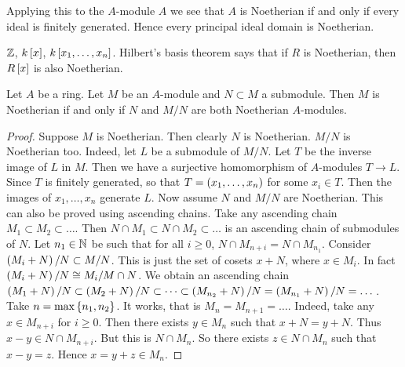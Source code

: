 \begin{remark}
Applying this to the $ A $-module $ A $ we see that $ A $ is Noetherian if and only if every ideal is finitely generated. Hence every principal ideal domain is Noetherian.
\end{remark}

\begin{example*}
$ \mathbb{Z} $, $ k\sbr{x} $, $ k\sbr{x_1, \dots, x_n} $. Hilbert's basis theorem says that if $ R $ is Noetherian, then $ R\sbr{x} $ is also Noetherian.
\end{example*}

\pagebreak

\begin{proposition}
\label{prop:10.4}
Let $ A $ be a ring. Let $ M $ be an $ A $-module and $ N \subset M $ a submodule. Then $ M $ is Noetherian if and only if $ N $ and $ M / N $ are both Noetherian $ A $-modules.
\end{proposition}

\begin{proof}
Suppose $ M $ is Noetherian. Then clearly $ N $ is Noetherian. $ M / N $ is Noetherian too. Indeed, let $ L $ be a submodule of $ M / N $. Let $ T $ be the inverse image of $ L $ in $ M $. Then we have a surjective homomorphism of $ A $-modules $ T \to L $. Since $ T $ is finitely generated, so that $ T = \br{x_1, \dots, x_n} $ for some $ x_i \in T $. Then the images of $ x_1, \dots, x_n $ generate $ L $. Now assume $ N $ and $ M / N $ are Noetherian. This can also be proved using ascending chains. Take any ascending chain $ M_1 \subset M_2 \subset \dots $. Then $ N \cap M_1 \subset N \cap M_2 \subset \dots $ is an ascending chain of submodules of $ N $. Let $ n_1 \in \mathbb{N} $ be such that for all $ i \ge 0 $, $ N \cap M_{n + i} = N \cap M_{n_1} $. Consider $ \br{M_i + N} / N \subset M / N $. This is just the set of cosets $ x + N $, where $ x \in M_i $. In fact $ \br{M_i + N} / N \cong M_i / M \cap N $. We obtain an ascending chain $ \br{M_1 + N} / N \subset \br{M_2 + N} / N \subset \dots \subset \br{M_{n_2} + N} / N = \br{M_{n_1} + N} / N = \dots $. Take $ n = \max\cbr{n_1, n_2} $. It works, that is $ M_n = M_{n + 1} = \dots $. Indeed, take any $ x \in M_{n + i} $ for $ i \ge 0 $. Then there exists $ y \in M_n $ such that $ x + N = y + N $. Thus $ x - y \in N \cap M_{n + i} $. But this is $ N \cap M_n $. So there exists $ z \in N \cap M_n $ such that $ x - y = z $. Hence $ x = y + z \in M_n $.
\end{proof}


